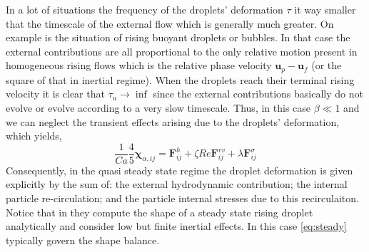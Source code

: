 In a lot of situations the frequency of the droplets' deformation $\tau$ it way smaller that the timescale of the external flow which is generally much greater. 
On example is the situation of rising buoyant droplets or bubbles. 
In that case the external contributions are all proportional to the only relative motion present in homogeneous rising flows which is the relative phase velocity $\textbf{u}_p-\textbf{u}_f$ (or the square of that in inertial regime).
When the droplets reach their terminal rising velocity it is clear that $\tau_u \to \inf$ since the external contributions basically do not evolve or evolve according to a very slow timescale. 
Thus, in this case $\beta \ll 1$ and we can neglect the transient effects arising due to the droplets' deformation, which yields, 
\begin{equation}
    \frac{1}{Ca}
    \frac{4  }{5} \bm\chi_{\alpha,ij}
    = \textbf{F}_{ij}^h 
    + \zeta Re \textbf{F}_{ij}^{vv}
    + \lambda \textbf{F}_{ij}^{\sigma}
    \label{eq:steady}
\end{equation}
Consequently, in the quasi steady state regime the droplet deformation is given explicitly by the sum of: the external hydrodynamic contribution; the internal particle re-circulation; and the particle internal stresses due to this recirculaiton. 
Notice that in \citet{taylor1964deformation} they compute the shape of a steady state rising droplet analytically and consider low but finite inertial effects. 
In this case \ref{eq:steady} typically govern the shape balance.
 

